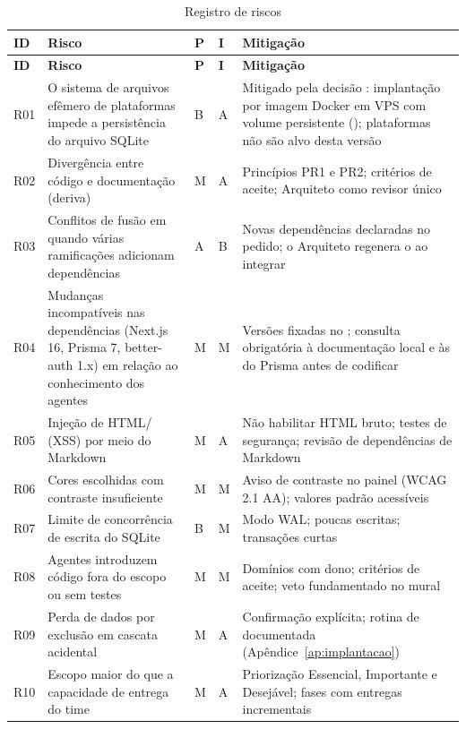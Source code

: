 \begin{longtable}{@{}L{1.0cm}L{5.0cm}L{0.7cm}L{0.7cm}L{6.9cm}@{}}
\caption{Registro de riscos}\label{tab:riscos}\\
\toprule
\textbf{ID} & \textbf{Risco} & \textbf{P} & \textbf{I} & \textbf{Mitigação}\\
\midrule
\endfirsthead
\toprule
\textbf{ID} & \textbf{Risco} & \textbf{P} & \textbf{I} & \textbf{Mitigação}\\
\midrule
\endhead
\bottomrule
\endfoot
R01 & O sistema de arquivos efêmero de plataformas  impede a persistência do arquivo SQLite & B & A & Mitigado pela decisão : implantação por imagem Docker em VPS com volume persistente (); plataformas  não são alvo desta versão\\
R02 & Divergência entre código e documentação (deriva) & M & A & Princípios PR1 e PR2; critérios de aceite; Arquiteto como revisor único\\
R03 & Conflitos de fusão em  quando várias ramificações adicionam dependências & A & B & Novas dependências declaradas no pedido; o Arquiteto regenera o  ao integrar\\
R04 & Mudanças incompatíveis nas dependências (Next.js 16, Prisma 7, better-auth 1.x) em relação ao conhecimento dos agentes & M & M & Versões fixadas no ; consulta obrigatória à documentação local e às  do Prisma antes de codificar\\
R05 & Injeção de HTML/ (XSS) por meio do Markdown & M & A & Não habilitar HTML bruto; testes de segurança; revisão de dependências de Markdown\\
R06 & Cores escolhidas com contraste insuficiente & M & M & Aviso de contraste no painel (WCAG 2.1 AA); valores padrão acessíveis\\
R07 & Limite de concorrência de escrita do SQLite & B & M & Modo WAL; poucas escritas; transações curtas\\
R08 & Agentes introduzem código fora do escopo ou sem testes & M & M & Domínios com dono; critérios de aceite; veto fundamentado no mural\\
R09 & Perda de dados por exclusão em cascata acidental & M & A & Confirmação explícita; rotina de  documentada (Apêndice~\ref{ap:implantacao})\\
R10 & Escopo maior do que a capacidade de entrega do time & M & A & Priorização Essencial, Importante e Desejável; fases com entregas incrementais\\

\end{longtable}
